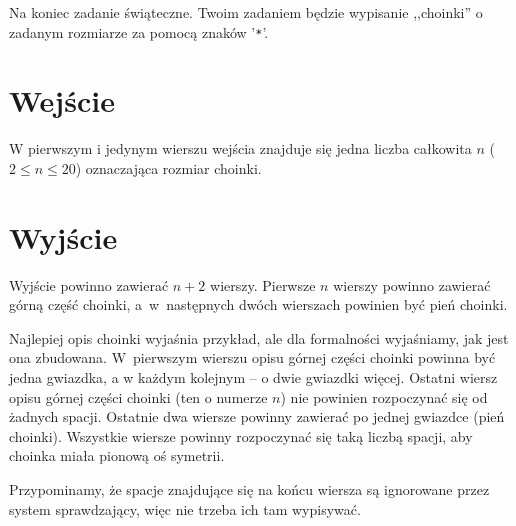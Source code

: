 \documentclass{spiral-kurs}
\begin{document}
\makeheader
%
  Na koniec zadanie świąteczne.
  Twoim zadaniem będzie wypisanie ,,choinki'' o zadanym rozmiarze za pomocą znaków '\texttt{*}'.

  \section{Wejście}
  W pierwszym i jedynym wierszu wejścia znajduje się
  jedna liczba całkowita $n$ ($2 \le n \le 20$) oznaczająca rozmiar choinki.
  
  \section{Wyjście}
  Wyjście powinno zawierać $n + 2$ wierszy.
  Pierwsze $n$ wierszy powinno zawierać górną część choinki,
  a~w~następnych dwóch wierszach powinien być pień choinki.

  Najlepiej opis choinki wyjaśnia przykład, ale dla formalności wyjaśniamy, jak
  jest ona zbudowana.
  W~pierwszym wierszu opisu górnej części choinki powinna być jedna gwiazdka,
  a w każdym kolejnym -- o dwie gwiazdki więcej.
  Ostatni wiersz opisu górnej części choinki (ten o numerze $n$) nie powinien rozpoczynać
  się od żadnych spacji.
  Ostatnie dwa wiersze powinny zawierać po jednej gwiazdce (pień choinki).
  Wszystkie wiersze powinny rozpoczynać się taką liczbą spacji, aby choinka
  miała pionową oś symetrii.

  Przypominamy, że spacje znajdujące się na końcu wiersza są ignorowane
  przez system sprawdzający, więc nie trzeba ich tam wypisywać.




  
\end{document}
